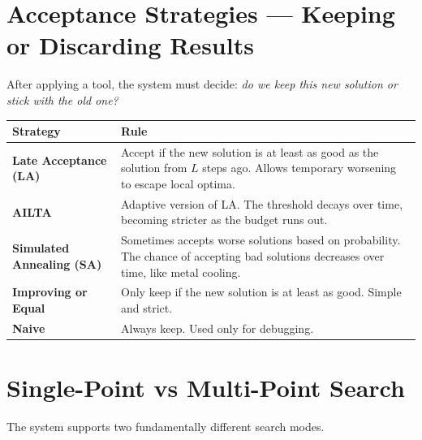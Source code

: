 \documentclass[12pt, a4paper]{article}
\begin{document}
\section{Acceptance Strategies --- Keeping or Discarding Results}

After applying a tool, the system must decide: \emph{do we keep this new
solution or stick with the old one?}

\vspace{0.3cm}
\begin{center}
\begin{tabularx}{\linewidth}{>{\bfseries}p{3.8cm} X}
\toprule
\textbf{Strategy} & \textbf{Rule} \\
\midrule
Late Acceptance (LA)
  & Accept if the new solution is at least as good as the solution from $L$ steps ago.
    Allows temporary worsening to escape local optima. \\[6pt]
AILTA
  & Adaptive version of LA. The threshold decays over time, becoming stricter as
    the budget runs out. \\[6pt]
Simulated Annealing (SA)
  & Sometimes accepts worse solutions based on probability. The chance of accepting
    bad solutions decreases over time, like metal cooling. \\[6pt]
Improving or Equal
  & Only keep if the new solution is at least as good. Simple and strict. \\[6pt]
Naive
  & Always keep. Used only for debugging. \\
\bottomrule
\end{tabularx}
\end{center}

\section{Single-Point vs Multi-Point Search}

The system supports two fundamentally different search modes.
\end{document}
